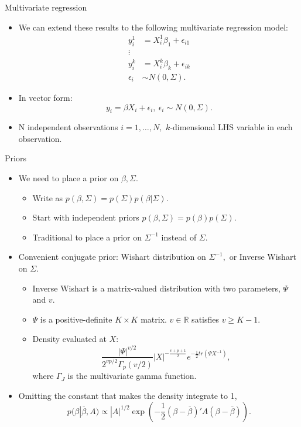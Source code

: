 \documentclass[aspectratio=169]{beamer}
\begin{document}
%
\begin{frame}{Multivariate regression}
\begin{itemize}
\item We can extend these results to the following multivariate regression
model:
\begin{align*}
y_{i}^{1} & =X_{i}^{1}\beta_{1}+\epsilon_{i1}\\
\vdots\\
y_{i}^{k} & =X_{i}^{k}\beta_{k}+\epsilon_{ik}\\
\epsilon_{i} & \sim N(0,\Sigma).
\end{align*}
\item In vector form: 
\[
y_{i}=\beta X_{i}+\epsilon_{i},\ \epsilon_{i}\sim N(0,\Sigma).
\]
\item N independent observations $i=1,\ldots,N,$ $k$-dimensional LHS variable
in each observation.
\end{itemize}
\end{frame}
%
\begin{frame}{Priors}
\begin{itemize}
\item We need to place a prior on $\beta,\Sigma.$

\begin{itemize}
\item Write as $p(\beta,\Sigma)=p(\Sigma)p(\beta|\Sigma).$
\item Start with independent priors $p(\beta,\Sigma)=p(\beta)p(\Sigma).$
\item Traditional to place a prior on $\Sigma^{-1}$ instead of $\Sigma.$
\end{itemize}
\item Convenient conjugate prior: Wishart distribution on $\Sigma^{-1},$
or Inverse Wishart on $\Sigma.$

\begin{itemize}
\item Inverse Wishart is a matrix-valued distribution with two parameters,
$\Psi$ and $v$.
\item $\Psi$ is a positive-definite $K\times K$ matrix. $v\in\mathbb{R}$
satisfies $v\geq K-1.$
\item Density evaluated at $X:$ 
\[
\frac{|\Psi|^{v/2}}{2^{vp/2}\Gamma_{p}(v/2)}|X|^{-\frac{v+p+1}{2}}e^{-\frac{1}{2}tr(\Psi X^{-1})},
\]
 where $\Gamma_{J}$ is the multivariate gamma function.
\end{itemize}
\item Omitting the constant that makes the density integrate to 1, 
\[
p(\beta|\overline{\beta},A)\propto|A|^{1/2}\exp(-\frac{1}{2}(\beta-\overline{\beta})'A(\beta-\overline{\beta})).
\]
\end{itemize}
\end{frame}
\end{document}
